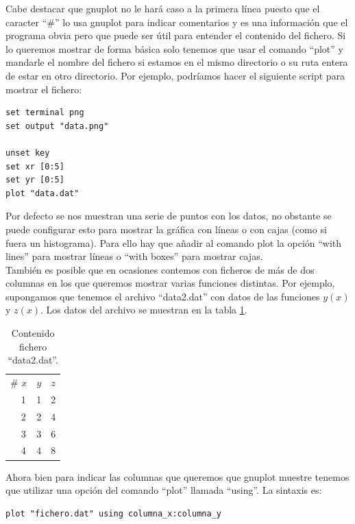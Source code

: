 \documentclass[11pt,a4paper,twoside,pdf]{article}
\numberwithin{equation}{section}
\begin{document}
Cabe destacar que gnuplot no le hará caso a la primera línea puesto que el caracter ``\#'' lo usa gnuplot para indicar comentarios y es una información que el programa obvia pero que puede ser útil para entender el contenido del fichero. Si lo queremos mostrar de forma básica solo tenemos que usar el comando ``plot'' y mandarle el nombre del fichero si estamos en el mismo directorio o su ruta entera de estar en otro directorio. Por ejemplo, podríamos hacer el siguiente script para mostrar el fichero:

\begin{lstlisting}[language=Gnuplot]
set terminal png
set output "data.png"

unset key
set xr [0:5]
set yr [0:5]
plot "data.dat"
\end{lstlisting}

Por defecto se nos muestran una serie de puntos con los datos, no obstante se puede configurar esto para mostrar la gráfica con líneas o con cajas (como si fuera un histograma). Para ello hay que añadir al comando plot la opción ``with lines'' para mostrar líneas o ``with boxes'' para mostrar cajas. \\

También es posible que en ocasiones contemos con ficheros de más de dos columnas en los que queremos mostrar varias funciones distintas. Por ejemplo, supongamos que tenemos el archivo ``data2.dat'' con datos de las funciones $y(x)$ y $z(x)$. Los datos del archivo se muestran en la tabla \ref{tab:data_plot_columnas}. \\

\begin{table}[h]
    \centering
    \caption{Contenido fichero ``data2.dat''.}
    \vspace{10pt}
    \label{tab:data_plot_columnas}
    \begin{tabular}{ccc}
        \# $x$ & $y$ & $z$ \\
        \ \ 1 & 1 & 2 \\
        \ \ 2 & 2 & 4\\
        \ \ 3 & 3 & 6\\
        \ \ 4 & 4 & 8\\
    \end{tabular}
\end{table}

Ahora bien para indicar las columnas que queremos que gnuplot muestre tenemos que utilizar una opción del comando ``plot'' llamada ``using''. La sintaxis es:

\begin{lstlisting}[language=Gnuplot]
plot "fichero.dat" using columna_x:columna_y
\end{lstlisting}
\end{document}
